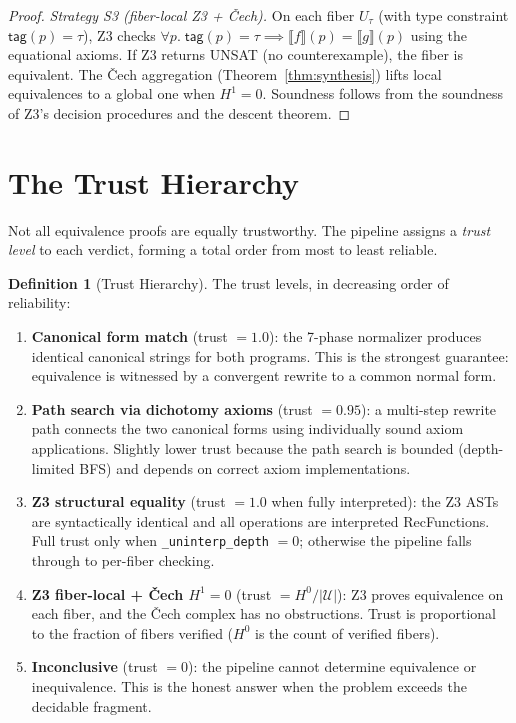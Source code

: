 \documentclass[11pt,a4paper]{report}
\theoremstyle{definition}
\newtheorem{definition}{Definition}[chapter]
\theoremstyle{plain}
\newcommand{\den}[1]{\llbracket #1 \rrbracket}
\newcommand{\covers}{\mathcal{U}}
\newcommand{\Hone}{H^1}
\begin{document}
\begin{proof}
\emph{Strategy S3 (fiber-local Z3 + \v{C}ech).}
On each fiber $U_\tau$ (with type constraint
$\mathsf{tag}(p) = \tau$), Z3 checks
$\forall p.\; \mathsf{tag}(p) = \tau \implies \den{f}(p) = \den{g}(p)$
using the equational axioms.  If Z3 returns UNSAT (no counterexample),
the fiber is equivalent.  The \v{C}ech aggregation
(Theorem~\ref{thm:synthesis}) lifts local equivalences to a global
one when $\Hone = 0$.  Soundness follows from the soundness of Z3's
decision procedures and the descent theorem.
\end{proof}

\section{The Trust Hierarchy}
\label{sec:trust-hierarchy}

Not all equivalence proofs are equally trustworthy.  The pipeline
assigns a \emph{trust level} to each verdict, forming a total order
from most to least reliable.

\begin{definition}[Trust Hierarchy]
\label{def:trust-hierarchy}
The trust levels, in decreasing order of reliability:
\begin{enumerate}
  \item \textbf{Canonical form match} (trust $= 1.0$): the 7-phase
    normalizer produces identical canonical strings for both
    programs.  This is the strongest guarantee: equivalence is
    witnessed by a convergent rewrite to a common normal form.

  \item \textbf{Path search via dichotomy axioms} (trust $= 0.95$):
    a multi-step rewrite path connects the two canonical forms using
    individually sound axiom applications.  Slightly lower trust
    because the path search is bounded (depth-limited BFS) and
    depends on correct axiom implementations.

  \item \textbf{Z3 structural equality} (trust $= 1.0$ when fully
    interpreted): the Z3 ASTs are syntactically identical and all
    operations are interpreted RecFunctions.  Full trust only when
    \texttt{\_uninterp\_depth} $= 0$; otherwise the pipeline falls
    through to per-fiber checking.

  \item \textbf{Z3 fiber-local + \v{C}ech $\Hone = 0$}
    (trust $= H^0 / |\covers|$): Z3 proves equivalence on each
    fiber, and the \v{C}ech complex has no obstructions.  Trust is
    proportional to the fraction of fibers verified ($H^0$ is the
    count of verified fibers).

  \item \textbf{Inconclusive} (trust $= 0$): the pipeline cannot
    determine equivalence or inequivalence.  This is the honest
    answer when the problem exceeds the decidable fragment.
\end{enumerate}
\end{definition}
\end{document}
